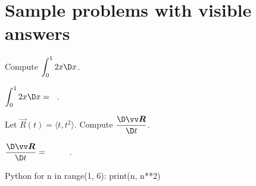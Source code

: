 \documentclass[worksheet]{workbook}
\begin{document}
\maketitle

\section{Sample problems with visible answers}
\begin{exercise}[Integral]
Compute $\dint_0^1 2x\dx$.
\mysskip
\begin{solution}
$\dint_0^1 2x\dx = \tsol{1}$.
\end{solution}
\end{exercise}

\begin{exercise}
Let $\vec{R}(t)=\langle t,t^2\rangle$. Compute $\dvRdt$.
\mysskip
\begin{solution}
$\dvRdt = \tsol{\langle 1,2t\rangle}$.
\end{solution}
\end{exercise}

\begin{code}{Python}
for n in range(1, 6):
    print(n, n**2)
\end{code}
\end{document}
